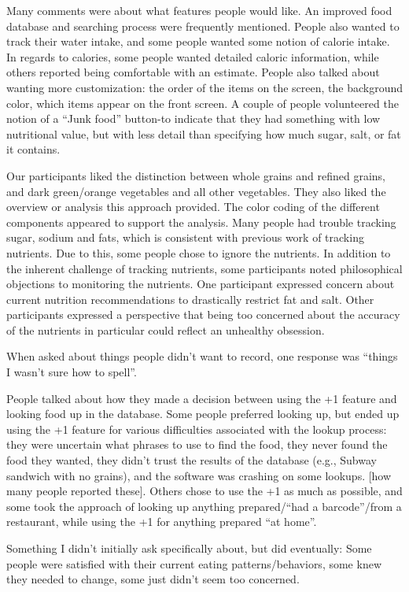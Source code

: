 Many comments were about what features people would like. An improved food database and searching process were frequently mentioned. People also wanted to track their water intake, and some people wanted some notion of calorie intake. In regards to calories, some people wanted detailed caloric information, while others reported being comfortable with an estimate. People also talked about wanting more customization: the order of the items on the screen, the background color, which items appear on the front screen. A couple of people volunteered the notion of a ``Junk food'' button-to indicate that they had something with low nutritional value, but with less detail than specifying how much sugar, salt, or fat it contains. 

Our participants liked the distinction between whole grains and refined grains, and dark green/orange vegetables and all other vegetables. They also liked the overview or analysis this approach provided. The color coding of the different components appeared to support the analysis. Many people had trouble tracking sugar, sodium and fats, which is consistent with previous work of tracking nutrients. Due to this, some people chose to ignore the nutrients. In addition to the inherent challenge of tracking nutrients, some participants noted philosophical objections to monitoring the nutrients. One participant expressed concern about current nutrition recommendations to drastically restrict fat and salt. Other participants expressed a perspective that being too concerned about the accuracy of the nutrients in particular could reflect an unhealthy obsession. 

When asked about things people didn't want to record, one response was ``things I wasn't sure how to spell''. 

People talked about how they made a decision between using the +1 feature and looking food up in the database. Some people preferred looking up, but ended up using the +1 feature for various difficulties associated with the lookup process: they were uncertain what phrases to use to find the food, they never found the food they wanted, they didn't trust the results of the database (e.g., Subway sandwich with no grains), and the software was crashing on some lookups. [how many people reported these]. Others chose to use the +1 as much as possible, and some took the approach of looking up anything prepared/``had a barcode''/from a restaurant, while using the +1 for anything prepared ``at home''. 

Something I didn't initially ask specifically about, but did eventually: Some people were satisfied with their current eating patterns/behaviors, some knew they needed to change, some just didn't seem too concerned. 

